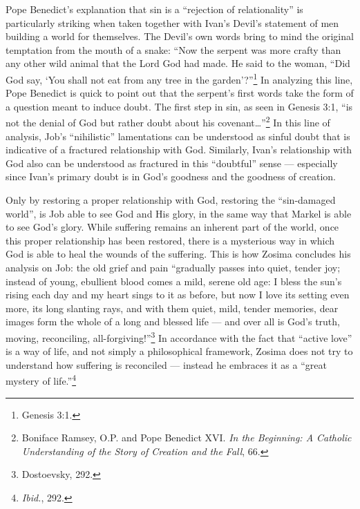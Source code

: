 Pope Benedict's explanation that sin is a ``rejection of relationality'' is particularly striking when taken together with Ivan's Devil's statement of men building a world for themselves. The Devil's own words bring to mind the original temptation from the mouth of a snake: ``Now the serpent was more crafty than any other wild animal that the Lord God had made. He said to the woman, ``Did God say, `You shall not eat from any tree in the garden'?''\footnote{Genesis 3:1.} In analyzing this line, Pope Benedict is quick to point out that the serpent's first words take the form of a question meant to induce doubt. The first step in sin, as seen in Genesis 3:1, ``is not the denial of God but rather doubt about his covenant\ldots''\footnote{Boniface Ramsey, O.P. and Pope Benedict XVI. \emph{In the Beginning: A Catholic Understanding of the Story of Creation and the Fall}, 66.} In this line of analysis, Job's ``nihilistic'' lamentations can be understood as sinful doubt that is indicative of a fractured relationship with God. Similarly, Ivan's relationship with God also can be understood as fractured in this ``doubtful'' sense --- especially since Ivan's primary doubt is in God's goodness and the goodness of creation. 

Only by restoring a proper relationship with God, restoring the ``sin-damaged world'', is Job able to see God and His glory, in the same way that Markel is able to see God's glory. While suffering remains an inherent part of the world, once this proper relationship has been restored, there is a mysterious way in which God is able to heal the wounds of the suffering. This is how Zosima concludes his analysis on Job: the old grief and pain ``gradually passes into quiet, tender joy; instead of young, ebullient blood comes a mild, serene old age: I bless the sun's rising each day and my heart sings to it as before, but now I love its setting even more, its long slanting rays, and with them quiet, mild, tender memories, dear images form the whole of a long and blessed life --- and over all is God's truth, moving, reconciling, all-forgiving!''\footnote{Dostoevsky, 292.} In accordance with the fact that ``active love'' is a way of life, and not simply a philosophical framework, Zosima does not try to understand how suffering is reconciled --- instead he embraces it as a ``great mystery of life.''\footnote{\emph{Ibid.}, 292.}

